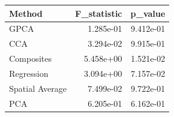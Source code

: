 \begin{tabular}{lrr}
\toprule
Method & F_statistic & p_value \\
\midrule
GPCA & 1.285e-01 & 9.412e-01 \\
CCA & 3.294e-02 & 9.915e-01 \\
Composites & 5.458e+00 & 1.521e-02 \\
Regression & 3.094e+00 & 7.157e-02 \\
Spatial Average & 7.499e-02 & 9.722e-01 \\
PCA & 6.205e-01 & 6.162e-01 \\
\bottomrule
\end{tabular}
